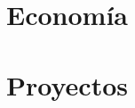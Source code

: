 \documentclass[12pt,oneside,a4paper]{article}
\begin{document}


\vspace{3cm}

{\tableofcontents}

\newpage

\part{Economía} %
\label{prt:economía_}





\newpage



\newpage



\newpage

\part{Proyectos} %
\label{prt:proyectos_}









\end{document}
